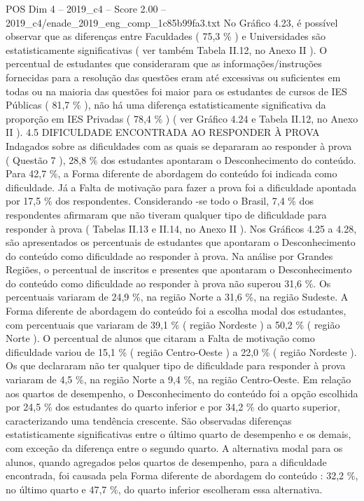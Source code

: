 \begin{textsample}{POS Dim 4 – 2019\_c4 – Score 2.00 – 2019\_c4/enade\_2019\_eng\_comp\_1c85b99fa3.txt}
No Gráfico 4.23, é possível observar que as diferenças entre Faculdades ( 75,3 \% ) e Universidades são estatisticamente significativas ( ver também Tabela II.12, no Anexo II ).
O percentual de estudantes que consideraram que as informações/instruções fornecidas para a resolução das questões eram até excessivas ou suficientes em todas ou na maioria das questões foi maior para os estudantes de cursos de IES Públicas ( 81,7 \% ), não há uma diferença estatisticamente significativa da proporção em IES Privadas ( 78,4 \% ) ( ver Gráfico 4.24 e Tabela II.12, no Anexo II ). 4.5 DIFICULDADE ENCONTRADA AO RESPONDER À PROVA Indagados sobre as dificuldades com as quais se depararam ao responder à prova ( Questão 7 ), 28,8 \% dos estudantes apontaram o Desconhecimento do conteúdo.
Para 42,7 \%, a Forma diferente de abordagem do conteúdo foi indicada como dificuldade.
Já a Falta de motivação para fazer a prova foi a dificuldade apontada por 17,5 \% dos respondentes.
Considerando -se todo o Brasil, 7,4 \% dos respondentes afirmaram que não tiveram qualquer tipo de dificuldade para responder à prova ( Tabelas II.13 e II.14, no Anexo II ).
Nos Gráficos 4.25 a 4.28, são apresentados os percentuais de estudantes que apontaram o Desconhecimento do conteúdo como dificuldade ao responder à prova.
Na análise por Grandes Regiões, o percentual de inscritos e presentes que apontaram o Desconhecimento do conteúdo como dificuldade ao responder à prova não superou 31,6 \%.
Os percentuais variaram de 24,9 \%, na região Norte a 31,6 \%, na região Sudeste.
A Forma diferente de abordagem do conteúdo foi a escolha modal dos estudantes, com percentuais que variaram de 39,1 \% ( região Nordeste ) a 50,2 \% ( região Norte ).
O percentual de alunos que citaram a Falta de motivação como dificuldade variou de 15,1 \% ( região Centro-Oeste ) a 22,0 \% ( região Nordeste ).
Os que declararam não ter qualquer tipo de dificuldade para responder à prova variaram de 4,5 \%, na região Norte a 9,4 \%, na região Centro-Oeste.
Em relação aos quartos de desempenho, o Desconhecimento do conteúdo foi a opção escolhida por 24,5 \% dos estudantes do quarto inferior e por 34,2 \% do quarto superior, caracterizando uma tendência crescente.
São observadas diferenças estatisticamente significativas entre o último quarto de desempenho e os demais, com exceção da diferença entre o segundo quarto.
A alternativa modal para os alunos, quando agregados pelos quartos de desempenho, para a dificuldade encontrada, foi causada pela Forma diferente de abordagem do conteúdo : 32,2 \%, no último quarto e 47,7 \%, do quarto inferior escolheram essa alternativa.

\end{textsample}
